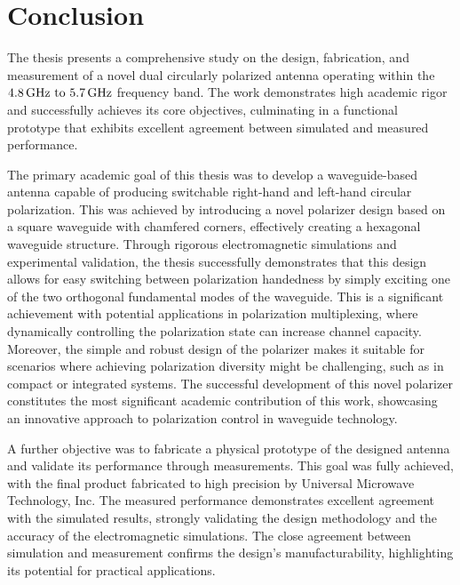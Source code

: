 \documentclass[14pt,a4paper]{ntust_report}
\begin{document}
\chapter*{Conclusion}
\label{chapter:conclusion}

The thesis presents a comprehensive study on the design, fabrication, and measurement of a novel dual circularly polarized antenna operating within the $\frequencyrange$ frequency band. The work demonstrates high academic rigor and successfully achieves its core objectives, culminating in a functional prototype that exhibits excellent agreement between simulated and measured performance.

The primary academic goal of this thesis was to develop a waveguide-based antenna capable of producing switchable right-hand and left-hand circular polarization. This was achieved by introducing a novel polarizer design based on a square waveguide with chamfered corners, effectively creating a hexagonal waveguide structure. Through rigorous electromagnetic simulations and experimental validation, the thesis successfully demonstrates that this design allows for easy switching between polarization handedness by simply exciting one of the two orthogonal fundamental modes of the waveguide. This is a significant achievement with potential applications in polarization multiplexing, where dynamically controlling the polarization state can increase channel capacity. Moreover, the simple and robust design of the polarizer makes it suitable for scenarios where achieving polarization diversity might be challenging, such as in compact or integrated systems. The successful development of this novel polarizer constitutes the most significant academic contribution of this work, showcasing an innovative approach to polarization control in waveguide technology.

A further objective was to fabricate a physical prototype of the designed antenna and validate its performance through measurements. This goal was fully achieved, with the final product fabricated to high precision by Universal Microwave Technology, Inc. The measured performance demonstrates excellent agreement with the simulated results, strongly validating the design methodology and the accuracy of the electromagnetic simulations. The close agreement between simulation and measurement confirms the design's manufacturability, highlighting its potential for practical applications.
\end{document}

